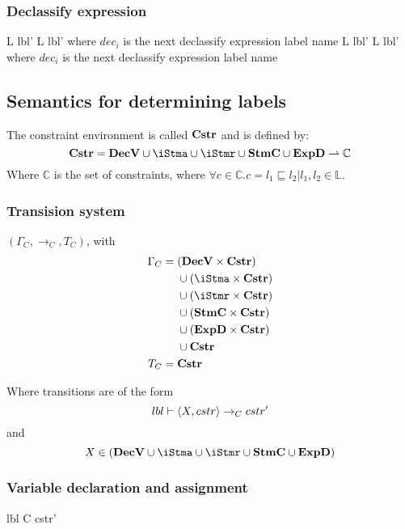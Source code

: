 \subsubsection{Declassify expression}

\begin{trules}
        { {L} {lbl'} }
        { {L} {lbl'} }
        {where $dec_i$ is the next declassify expression label name}
        { {L} {lbl'} }
        { {L} {lbl'} }
        {where $dec_i$ is the next declassify expression label name}
\end{trules}

\subsection{Semantics for determining labels}
The constraint environment is called $\mathbf{Cstr}$ and is defined by:
\[
  \iCstr = \iDecv \cup \iStma \cup \iStmr \cup \iStmc \cup \iExpd \rightharpoonup \mathbb{C}
\]
Where $\mathbb{C}$ is the set of constraints, where $\forall c \in \mathbb{C} . c = l_1 \sqsubseteq l_2 | l_1, l_2 \in \mathbb{L}$.

\subsubsection{Transision system}
$(\Gamma_{C}, \rightarrow_{C}, T_{C})$, with
\begin{align*}
  \Gamma_{C} =  & \;        (\iDecv \times \iCstr) \\
                & \;  \cup  (\iStma \times \iCstr) \\
                & \;  \cup  (\iStmr \times \iCstr) \\
                & \;  \cup  (\iStmc \times \iCstr) \\
                & \;  \cup  (\iExpd \times \iCstr) \\
                & \;  \cup   \iCstr \\
  T_{C} =       & \;  \iCstr
\end{align*}

\noindent Where transitions are of the form
  \[ lbl \vdash \langle X, cstr \rangle \rightarrow_{C} cstr' \]
  and
  \[ X \in (\iDecv \cup \iStma \cup \iStmr \cup \iStmc \cup \iExpd) \]

\subsubsection{Variable declaration and assignment}

\begin{trules}
        {lbl \vdash {} {C} {cstr'} }
        {}
        {}
        {}
        {}
        {}
\end{trules}


